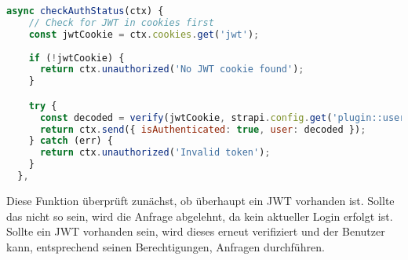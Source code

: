 \begin{lstlisting}[language=JavaScript, caption={checkAuthStatus-Funktion}, label={lst:customjsCheckAuthStatus}]
async checkAuthStatus(ctx) {
    // Check for JWT in cookies first
    const jwtCookie = ctx.cookies.get('jwt');
    
    if (!jwtCookie) {
      return ctx.unauthorized('No JWT cookie found');
    }

    try {
      const decoded = verify(jwtCookie, strapi.config.get('plugin::users-permissions.jwtSecret'));
      return ctx.send({ isAuthenticated: true, user: decoded });
    } catch (err) {
      return ctx.unauthorized('Invalid token');
    }
  },
\end{lstlisting}

Diese Funktion überprüft zunächst, ob überhaupt ein JWT vorhanden ist. Sollte das nicht so sein, wird die Anfrage abgelehnt, da kein aktueller Login erfolgt ist. Sollte ein JWT vorhanden sein, wird dieses erneut verifiziert und der Benutzer kann, entsprechend seinen Berechtigungen, Anfragen durchführen.